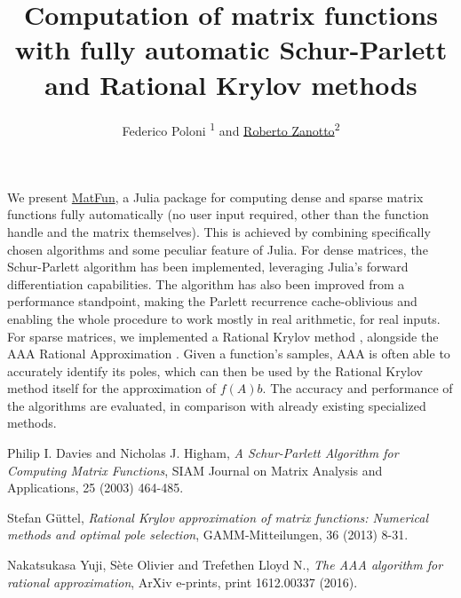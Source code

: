 \documentclass{paper}
\newcommand{\indexauthors}[1]{%
        \forcsvlist{\index}{#1}}
\begin{document}
\title{Computation of matrix functions with fully automatic Schur-Parlett and Rational Krylov methods}
\author{Federico Poloni \textsuperscript{1}
        and \underline{Roberto Zanotto}\textsuperscript{2}}


\indexauthors{Poloni!Federico, Zanotto!Roberto}
\maketitle

We present \href{https://github.com/robzan8/MatFun.jl}{MatFun}, a Julia package for computing dense and sparse matrix functions fully automatically (no user input required, other than the function handle and the matrix themselves). This is achieved by combining specifically chosen algorithms and some peculiar feature of Julia. For dense matrices, the Schur-Parlett algorithm \cite{label:1} has been implemented, leveraging Julia's forward differentiation capabilities. The algorithm has also been improved from a performance standpoint, making the Parlett recurrence cache-oblivious and enabling the whole procedure to work mostly in real arithmetic, for real inputs. For sparse matrices, we implemented a Rational Krylov method \cite{label:2}, alongside the AAA Rational Approximation \cite{label:3}. Given a function's samples, AAA is often able to accurately identify its poles, which can then be used by the Rational Krylov method itself for the approximation of \(f(A)b\). The accuracy and performance of the algorithms are evaluated, in comparison with already existing specialized methods.

\small
\begin{thebibliography}{10}

 Philip I. Davies and Nicholas J. Higham,
\textit{A Schur-Parlett Algorithm for Computing Matrix Functions},
SIAM Journal on Matrix Analysis and Applications, 25 (2003) 464-485.

 Stefan G{\"u}ttel,
\textit{Rational Krylov approximation of matrix functions: Numerical methods and optimal pole selection},
GAMM-Mitteilungen, 36 (2013) 8-31.

 Nakatsukasa Yuji, S{\`e}te Olivier and Trefethen Lloyd N.,
\textit{The AAA algorithm for rational approximation},
ArXiv e-prints, print 1612.00337 (2016).

\end{thebibliography}
\end{document}
